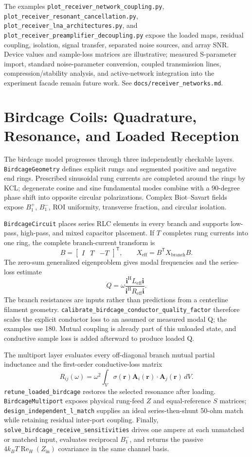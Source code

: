 \documentclass[11pt,oneside]{report}
\newcommand{\code}[1]{\texttt{#1}}
\begin{document}
The examples \code{plot\_receiver\_network\_coupling.py},
\code{plot\_receiver\_resonant\_cancellation.py},
\code{plot\_receiver\_lna\_architectures.py}, and
\code{plot\_receiver\_preamplifier\_decoupling.py} expose the loaded maps,
residual coupling, isolation, signal transfer, separated noise sources, and
array SNR. Device values and sample-loss matrices are illustrative; measured
S-parameter import, standard noise-parameter conversion, coupled transmission
lines, compression/stability analysis, and active-network integration into the
experiment facade remain future work. See \code{docs/receiver\_networks.md}.

\section{Birdcage Coils: Quadrature, Resonance, and Loaded Reception}
\label{sec:birdcage-coils}

The birdcage model progresses through three independently checkable layers.
\code{BirdcageGeometry} defines explicit rungs and segmented positive and
negative end rings. Prescribed sinusoidal rung currents are completed around the
rings by KCL; degenerate cosine and sine fundamental modes combine with a
90-degree phase shift into opposite circular polarizations. Complex Biot--Savart
fields expose \(B_1^+\), \(B_1^-\), ROI uniformity, transverse fraction, and
circular isolation.

\code{BirdcageCircuit} places series RLC elements in every branch and supports
low-pass, high-pass, and mixed capacitor placement. If \(T\) completes rung
currents into one ring, the complete branch-current transform is
\[
 B=\begin{bmatrix}I&T&-T\end{bmatrix}^{\mathsf T},
 \qquad X_{\mathrm{eff}}=B^{\mathsf T}X_{\mathrm{branch}}B.
\]
The zero-sum generalized eigenproblem gives modal frequencies and the
series-loss estimate
\[
 Q=\omega\frac{\mathbf i^{\mathrm H}L_{\mathrm{eff}}\mathbf i}
                    {\mathbf i^{\mathrm H}R_{\mathrm{eff}}\mathbf i}.
\]
The branch resistances are inputs rather than predictions from a centerline
filament geometry. \code{calibrate\_birdcage\_conductor\_quality\_factor}
therefore scales the explicit conductor loss to an assumed or measured modal Q;
the examples use 180. Mutual coupling is already part of this unloaded state,
and conductive sample loss is added afterward to produce loaded Q.

The multiport layer evaluates every off-diagonal branch mutual partial
inductance and the first-order conductive-loss matrix
\[
 R_{ij}(\omega)=\omega^2\int_V\sigma(\mathbf r)
 \mathbf A_i(\mathbf r)\!\cdot\!\mathbf A_j(\mathbf r)\,dV.
\]
\code{retune\_loaded\_birdcage} restores the selected resonance after loading.
\code{BirdcageMultiport} exposes physical rung-feed \(Z\) and equal-reference
\(S\) matrices; \code{design\_independent\_l\_match} supplies an ideal
series-then-shunt 50-ohm match while retaining residual inter-port coupling.
Finally, \code{solve\_birdcage\_receive\_sensitivities} drives one ampere at
each unmatched or matched input, evaluates reciprocal \(B_1^-\), and returns
the passive \(4k_BT\operatorname{Re}_H(Z_{\mathrm{in}})\) covariance in the same
channel basis.
\end{document}
